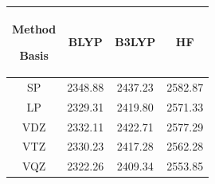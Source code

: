 \begin{table}
  \centering
  \caption[Functional and basis set dependence of  asymmetric stretch frequencies]{Dependence of \(\nu_3\) harmonic frequencies on functional (BLYP, B3LYP, and HF) and basis set (SP, LP, VDZ, VTZ, and VQZ) for an optimized gas-phase cluster consisting of  and one cation/anion pair. All frequencies reported in \si{\wavenumber}. Reported frequencies are unscaled.}
  \label{paper_02:tab:2}
  \begin{longtable}[]{@{}cccc@{}}
    \toprule
    \begin{minipage}[b]{0.24\columnwidth}\raggedright
      Method

      Basis\strut
    \end{minipage} & \begin{minipage}[b]{0.24\columnwidth}\raggedright
      BLYP\strut
    \end{minipage} & \begin{minipage}[b]{0.24\columnwidth}\raggedright
      B3LYP\strut
    \end{minipage} & \begin{minipage}[b]{0.24\columnwidth}\raggedright
      HF\strut
    \end{minipage}\tabularnewline
    \midrule
    \endhead
    SP & 2348.88 & 2437.23 & 2582.87\tabularnewline
    LP & 2329.31 & 2419.80 & 2571.33\tabularnewline
    VDZ & 2332.11 & 2422.71 & 2577.29\tabularnewline
    VTZ & 2330.23 & 2417.28 & 2562.28\tabularnewline
    VQZ & 2322.26 & 2409.34 & 2553.85\tabularnewline
    \bottomrule
  \end{longtable}
\end{table}

